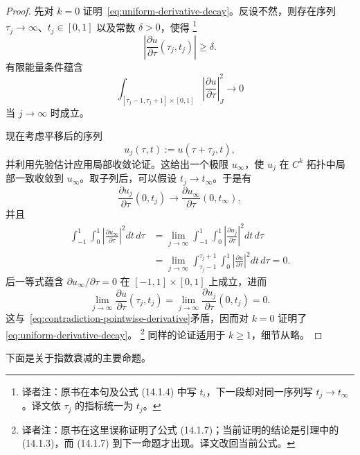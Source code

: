 \begin{proof}
先对 $k=0$ 证明~\eqref{eq:uniform-derivative-decay}。反设不然，则存在序列
$\tau_j\to\infty$、$t_j\in[0,1]$ 以及常数 $\delta>0$，使得
\footnote{译者注：原书在本句及公式 (14.1.4) 中写 $t_i$，下一段却对同一序列写
$t_j\to t_\infty$。译文依 $\tau_j$ 的指标统一为 $t_j$。}
\begin{equation}
  \left|
    \frac{\partial u}{\partial\tau}(\tau_j,t_j)
  \right|
  \geq\delta.
\label{eq:contradiction-pointwise-derivative}
\end{equation}
有限能量条件蕴含
\begin{equation}
  \int_{[\tau_j-1,\tau_j+1]\times[0,1]}
    \left|\frac{\partial u}{\partial\tau}\right|_J^2
  \longrightarrow0
\label{eq:local-tail-energy}
\end{equation}
当 $j\to\infty$ 时成立。

现在考虑平移后的序列
\[
  u_j(\tau,t):=u(\tau+\tau_j,t),
\]
并利用先验估计应用局部收敛论证。这给出一个极限 $u_\infty$，使 $u_j$ 在
$C^k$ 拓扑中局部一致收敛到 $u_\infty$。取子列后，可以假设
$t_j\to t_\infty$。于是有
\[
  \frac{\partial u_j}{\partial\tau}(0,t_j)
  \longrightarrow
  \frac{\partial u_\infty}{\partial\tau}(0,t_\infty),
\]
并且
\[
  \begin{aligned}
  \int_{-1}^1\int_0^1
    \left|\frac{\partial u_\infty}{\partial\tau}\right|^2dt\,d\tau
  &=\lim_{j\to\infty}
    \int_{-1}^1\int_0^1
      \left|\frac{\partial u_j}{\partial\tau}\right|^2dt\,d\tau\\
  &=\lim_{j\to\infty}
    \int_{\tau_j-1}^{\tau_j+1}\int_0^1
      \left|\frac{\partial u}{\partial\tau}\right|^2dt\,d\tau
   =0.
  \end{aligned}
\]
后一等式蕴含 $\partial u_\infty/\partial\tau=0$ 在
$[-1,1]\times[0,1]$ 上成立，进而
\[
  \lim_{j\to\infty}
    \frac{\partial u}{\partial\tau}(\tau_j,t_j)
  =
  \lim_{j\to\infty}
    \frac{\partial u_j}{\partial\tau}(0,t_j)
  =0.
\]
这与~\eqref{eq:contradiction-pointwise-derivative}矛盾，因而对 $k=0$ 证明了
\eqref{eq:uniform-derivative-decay}。
\footnote{译者注：原书在这里误称证明了公式 (14.1.7)；当前证明的结论是引理中的
(14.1.3)，而 (14.1.7) 到下一命题才出现。译文改回当前公式。}
同样的论证适用于 $k\geq1$，细节从略。
\end{proof}

下面是关于指数衰减的主要命题。

